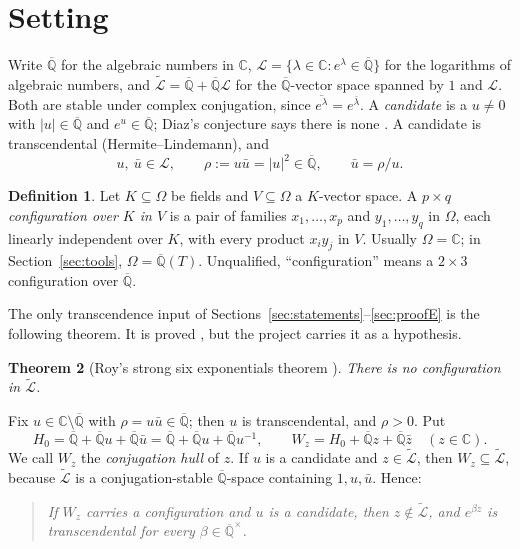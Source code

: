 \documentclass[11pt,a4paper]{article}
\theoremstyle{plain}
\newtheorem{theorem}{Theorem}[section]
\theoremstyle{definition}
\newtheorem{definition}[theorem]{Definition}
\newcommand{\C}{\mathbb{C}}
\newcommand{\Qbar}{\overline{\mathbb{Q}}}
\newcommand{\cL}{\mathcal{L}}
\newcommand{\Lt}{\widetilde{\mathcal{L}}}
\begin{document}
\section{Setting}\label{sec:setting}

Write $\Qbar$ for the algebraic numbers in $\C$, $\cL=\{\lambda\in\C:e^{\lambda}\in\Qbar\}$
for the logarithms of algebraic numbers, and $\Lt=\Qbar+\Qbar\cL$ for the $\Qbar$-vector
space spanned by $1$ and $\cL$. Both are stable under complex conjugation, since
$\overline{e^{\lambda}}=e^{\bar\lambda}$. A \emph{candidate} is a $u\neq0$ with
$|u|\in\Qbar$ and $e^{u}\in\Qbar$; Diaz's conjecture says there is none
\cite[\S5.1]{Dia04}. A candidate is transcendental (Hermite--Lindemann), and
\[
  u,\ \bar u\in\cL,\qquad \rho:=u\bar u=|u|^{2}\in\Qbar,\qquad \bar u=\rho/u .
\]

\begin{definition}
Let $K\subseteq\Omega$ be fields and $V\subseteq\Omega$ a $K$-vector space. A
\emph{$p\times q$ configuration over $K$ in $V$} is a pair of families $x_{1},\dots,x_{p}$
and $y_{1},\dots,y_{q}$ in $\Omega$, each linearly independent over $K$, with every
product $x_{i}y_{j}$ in $V$. Usually $\Omega=\C$; in Section~\ref{sec:tools},
$\Omega=\Qbar(T)$. Unqualified, ``configuration'' means a $2\times3$ configuration over
$\Qbar$.
\end{definition}

The only transcendence input of Sections~\ref{sec:statements}--\ref{sec:proofE} is the
following theorem. It is proved \cite{Roy92}, but the project carries it as a
hypothesis.

\begin{theorem}[Roy's strong six exponentials theorem {\cite[Cor.~2]{Roy92}}]\label{thm:roy}
There is no configuration in $\Lt$.
\end{theorem}

Fix $u\in\C\setminus\Qbar$ with $\rho=u\bar u\in\Qbar$; then $u$ is transcendental, and
$\rho>0$. Put
\[
  H_{0}=\Qbar+\Qbar u+\Qbar\bar u=\Qbar+\Qbar u+\Qbar u^{-1},
  \qquad
  W_{z}=H_{0}+\Qbar z+\Qbar\bar z\quad(z\in\C).
\]
We call $W_{z}$ the \emph{conjugation hull} of $z$. If $u$ is a candidate and
$z\in\Lt$, then $W_{z}\subseteq\Lt$, because $\Lt$ is a conjugation-stable $\Qbar$-space
containing $1,u,\bar u$. Hence:

\begin{quote}
\emph{If $W_{z}$ carries a configuration and $u$ is a candidate, then $z\notin\Lt$, and
$e^{\beta z}$ is transcendental for every $\beta\in\Qbar^{\times}$.}
\end{quote}
\end{document}
